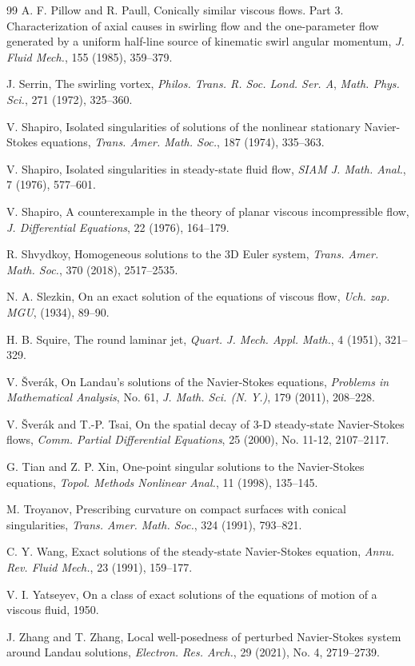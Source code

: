 \documentclass[12pt]{article}
\begin{document}
\begin{thebibliography}{99}
 A. F. Pillow and R. Paull, Conically similar viscous flows. Part 3. Characterization of axial causes in swirling flow and the one-parameter flow generated by a uniform half-line source of kinematic swirl angular momentum, \emph{J. Fluid Mech.}, 155 (1985), 359--379.

 J. Serrin, The swirling vortex, \emph{Philos. Trans. R. Soc. Lond. Ser. A}, \emph{Math. Phys. Sci.}, 271 (1972), 325--360.

 V. Shapiro, Isolated singularities of solutions of the nonlinear stationary Navier-Stokes equations, \emph{Trans. Amer. Math. Soc.}, 187 (1974), 335--363.

 V. Shapiro, Isolated singularities in steady-state fluid flow, \emph{SIAM J. Math. Anal.}, 7 (1976), 577--601.

 V. Shapiro, A counterexample in the theory of planar viscous incompressible flow, \emph{J. Differential Equations}, 22 (1976), 164--179.

 R. Shvydkoy, Homogeneous solutions to the 3D Euler system, \emph{Trans. Amer. Math. Soc.}, 370 (2018), 2517--2535.

 N. A. Slezkin, On an exact solution of the equations of viscous flow, \emph{Uch. zap. MGU}, (1934), 89--90.

 H. B. Squire, The round laminar jet, \emph{Quart. J. Mech. Appl. Math.}, 4 (1951), 321--329.

 V. \v{S}ver\'{a}k, On Landau's solutions of the Navier-Stokes equations, \emph{Problems in Mathematical Analysis}, No. 61, \emph{J. Math. Sci. (N. Y.)}, 179 (2011), 208--228. 

 V. \v{S}ver\'{a}k and T.-P. Tsai, On the spatial decay of 3-D steady-state Navier-Stokes flows, \emph{Comm. Partial Differential Equations}, 25 (2000), No. 11-12, 2107--2117. 

 G. Tian and Z. P. Xin, One-point singular solutions to the Navier-Stokes equations, \emph{Topol. Methods Nonlinear Anal.}, 11 (1998), 135--145.

 M. Troyanov, Prescribing curvature on compact surfaces with conical singularities, \emph{Trans. Amer. Math. Soc.}, 324 (1991), 793--821.

 C. Y. Wang, Exact solutions of the steady-state Navier-Stokes equation, \emph{Annu. Rev. Fluid Mech.}, 23 (1991), 159--177.

 V. I. Yatseyev, On a class of exact solutions of the equations of motion of a viscous fluid, 1950.

 J. Zhang and T. Zhang, Local well-posedness of perturbed Navier-Stokes system around Landau solutions, \emph{Electron. Res. Arch.}, 29 (2021), No. 4, 2719--2739.


\end{thebibliography}
\end{document}
